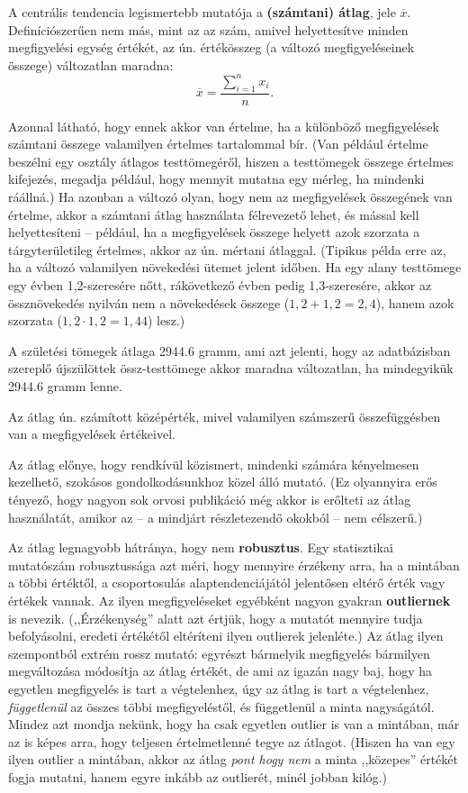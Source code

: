\documentclass[]{book}
\begin{document}
A centrális tendencia legismertebb mutatója a \textbf{(számtani) átlag}, jele \(\overline{x}\). Definíciószerűen nem más, mint az az szám, amivel helyettesítve minden megfigyelési egység értékét, az ún. értékösszeg (a változó megfigyeléseinek összege) változatlan maradna:
\[
    \overline{x}=\frac{\sum_{i=1}^n x_i}{n}.
\]

Azonnal látható, hogy ennek akkor van értelme, ha a különböző megfigyelések számtani összege valamilyen értelmes tartalommal bír. (Van például értelme beszélni egy osztály átlagos testtömegéről, hiszen a testtömegek összege értelmes kifejezés, megadja például, hogy mennyit mutatna egy mérleg, ha mindenki ráállná.) Ha azonban a változó olyan, hogy nem az megfigyelések összegének van értelme, akkor a számtani átlag használata félrevezető lehet, és mással kell helyettesíteni -- például, ha a megfigyelések összege helyett azok szorzata a tárgyterületileg értelmes, akkor az ún. mértani átlaggal. (Tipikus példa erre az, ha a változó valamilyen növekedési ütemet jelent időben. Ha egy alany testtömege egy évben 1,2-szeresére nőtt, rákövetkező évben pedig 1,3-szeresére, akkor az össznövekedés nyilván nem a növekedések összege (\(1,\!2 + 1,\!2 = 2,\!4\)), hanem azok szorzata (\(1,\!2 \cdot 1,\!2 = 1,\!44\)) lesz.)

A születési tömegek átlaga 2944.6 gramm, ami azt jelenti, hogy az adatbázisban szereplő újszülöttek össz-testtömege akkor maradna változatlan, ha mindegyikük 2944.6 gramm lenne.

Az átlag ún. számított középérték, mivel valamilyen számszerű összefüggésben van a megfigyelések értékeivel.

Az átlag előnye, hogy rendkívül közismert, mindenki számára kényelmesen kezelhető, szokásos gondolkodásunkhoz közel álló mutató. (Ez olyannyira erős tényező, hogy nagyon sok orvosi publikáció még akkor is erőlteti az átlag használatát, amikor az -- a mindjárt részletezendő okokból -- nem célszerű.)

Az átlag legnagyobb hátránya, hogy nem \textbf{robusztus}. Egy statisztikai mutatószám robusztussága azt méri, hogy mennyire érzékeny arra, ha a mintában a többi értéktől, a csoportosulás alaptendenciájától jelentősen eltérő érték vagy értékek vannak. Az ilyen megfigyeléseket egyébként nagyon gyakran \textbf{outliernek} is nevezik. (,,Érzékenység'' alatt azt értjük, hogy a mutatót mennyire tudja befolyásolni, eredeti értékétől eltéríteni ilyen outlierek jelenléte.) Az átlag ilyen szempontból extrém rossz mutató: egyrészt bármelyik megfigyelés bármilyen megváltozása módosítja az átlag értékét, de ami az igazán nagy baj, hogy ha egyetlen megfigyelés is tart a végtelenhez, úgy az átlag is tart a végtelenhez, \emph{függetlenül} az összes többi megfigyeléstől, és függetlenül a minta nagyságától. Mindez azt mondja nekünk, hogy ha csak egyetlen outlier is van a mintában, már az is képes arra, hogy teljesen értelmetlenné tegye az átlagot. (Hiszen ha van egy ilyen outlier a mintában, akkor az átlag \emph{pont hogy nem} a minta ,,közepes'' értékét fogja mutatni, hanem egyre inkább az outlierét, minél jobban kilóg.)
\end{document}
